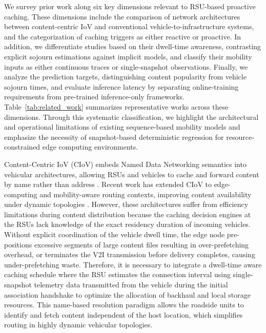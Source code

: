 \documentclass[journal]{IEEEtran}
\begin{document}
We survey prior work along six key dimensions relevant to RSU-based proactive caching. These dimensions include the comparison of network architectures between content-centric IoV and conventional vehicle-to-infrastructure systems, and the categorization of caching triggers as either reactive or proactive. In addition, we differentiate studies based on their dwell-time awareness, contrasting explicit sojourn estimations against implicit models, and classify their mobility inputs as either continuous traces or single-snapshot observations. Finally, we analyze the prediction targets, distinguishing content popularity from vehicle sojourn times, and evaluate inference latency by separating online-training requirements from pre-trained inference-only frameworks. Table~\ref{tab:related_work} summarizes representative works across these dimensions. Through this systematic classification, we highlight the architectural and operational limitations of existing sequence-based mobility models and emphasize the necessity of snapshot-based deterministic regression for resource-constrained edge computing environments.

Content-Centric IoV (CIoV) embeds Named Data Networking semantics into vehicular architectures, allowing RSUs and vehicles to cache and forward content by name rather than address \cite{2,3,12}. Recent work has extended CIoV to edge-computing and mobility-aware routing contexts, improving content availability under dynamic topologies \cite{13,14,15}. However, these architectures suffer from efficiency limitations during content distribution because the caching decision engines at the RSUs lack knowledge of the exact residency duration of incoming vehicles. Without explicit coordination of the vehicle dwell time, the edge node pre-positions excessive segments of large content files resulting in over-prefetching overhead, or terminates the V2I transmission before delivery completes, causing under-prefetching waste. Therefore, it is necessary to integrate a dwell-time aware caching schedule where the RSU estimates the connection interval using single-snapshot telemetry data transmitted from the vehicle during the initial association handshake to optimize the allocation of backhaul and local storage resources. This name-based resolution paradigm allows the roadside units to identify and fetch content independent of the host location, which simplifies routing in highly dynamic vehicular topologies.
\end{document}
